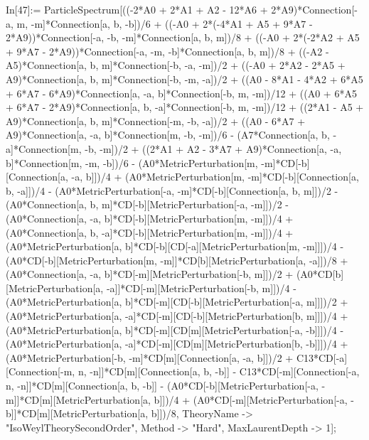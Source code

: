 In[47]:= ParticleSpectrum[((-2*A0 + 2*A1 + A2 - 12*A6 + 2*A9)*Connection[-a, m, -m]*Connection[a, b, -b])/6 + ((-A0 + 2*(-4*A1 + A5 + 9*A7 - 2*A9))*Connection[-a, -b, -m]*Connection[a, b, m])/8 + ((-A0 + 2*(-2*A2 + A5 + 9*A7 - 2*A9))*Connection[-a, -m, -b]*Connection[a, b, m])/8 + ((-A2 - A5)*Connection[a, b, m]*Connection[-b, -a, -m])/2 + ((-A0 + 2*A2 - 2*A5 + A9)*Connection[a, b, m]*Connection[-b, -m, -a])/2 + ((A0 - 8*A1 - 4*A2 + 6*A5 + 6*A7 - 6*A9)*Connection[a, -a, b]*Connection[-b, m, -m])/12 + ((A0 + 6*A5 + 6*A7 - 2*A9)*Connection[a, b, -a]*Connection[-b, m, -m])/12 + ((2*A1 - A5 + A9)*Connection[a, b, m]*Connection[-m, -b, -a])/2 + ((A0 - 6*A7 + A9)*Connection[a, -a, b]*Connection[m, -b, -m])/6 - (A7*Connection[a, b, -a]*Connection[m, -b, -m])/2 + ((2*A1 + A2 - 3*A7 + A9)*Connection[a, -a, b]*Connection[m, -m, -b])/6 - (A0*MetricPerturbation[m, -m]*CD[-b][Connection[a, -a, b]])/4 + (A0*MetricPerturbation[m, -m]*CD[-b][Connection[a, b, -a]])/4 - (A0*MetricPerturbation[-a, -m]*CD[-b][Connection[a, b, m]])/2 - (A0*Connection[a, b, m]*CD[-b][MetricPerturbation[-a, -m]])/2 - (A0*Connection[a, -a, b]*CD[-b][MetricPerturbation[m, -m]])/4 + (A0*Connection[a, b, -a]*CD[-b][MetricPerturbation[m, -m]])/4 + (A0*MetricPerturbation[a, b]*CD[-b][CD[-a][MetricPerturbation[m, -m]]])/4 - (A0*CD[-b][MetricPerturbation[m, -m]]*CD[b][MetricPerturbation[a, -a]])/8 + (A0*Connection[a, -a, b]*CD[-m][MetricPerturbation[-b, m]])/2 + (A0*CD[b][MetricPerturbation[a, -a]]*CD[-m][MetricPerturbation[-b, m]])/4 - (A0*MetricPerturbation[a, b]*CD[-m][CD[-b][MetricPerturbation[-a, m]]])/2 + (A0*MetricPerturbation[a, -a]*CD[-m][CD[-b][MetricPerturbation[b, m]]])/4 + (A0*MetricPerturbation[a, b]*CD[-m][CD[m][MetricPerturbation[-a, -b]]])/4 - (A0*MetricPerturbation[a, -a]*CD[-m][CD[m][MetricPerturbation[b, -b]]])/4 + (A0*MetricPerturbation[-b, -m]*CD[m][Connection[a, -a, b]])/2 + C13*CD[-a][Connection[-m, n, -n]]*CD[m][Connection[a, b, -b]] - C13*CD[-m][Connection[-a, n, -n]]*CD[m][Connection[a, b, -b]] - (A0*CD[-b][MetricPerturbation[-a, -m]]*CD[m][MetricPerturbation[a, b]])/4 + (A0*CD[-m][MetricPerturbation[-a, -b]]*CD[m][MetricPerturbation[a, b]])/8, TheoryName -> "IsoWeylTheorySecondOrder", Method -> "Hard", MaxLaurentDepth -> 1]; 